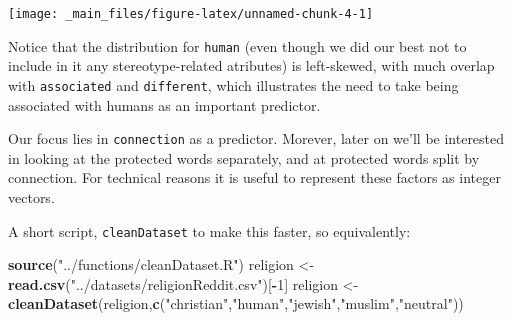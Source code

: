 \documentclass[12pt,]{book}
\newenvironment{Shaded}{\begin{snugshade}}{\end{snugshade}}
\newcommand{\KeywordTok}[1]{\textcolor[rgb]{0.13,0.29,0.53}{\textbf{#1}}}
\newcommand{\DecValTok}[1]{\textcolor[rgb]{0.00,0.00,0.81}{#1}}
\newcommand{\StringTok}[1]{\textcolor[rgb]{0.31,0.60,0.02}{#1}}
\newcommand{\OperatorTok}[1]{\textcolor[rgb]{0.81,0.36,0.00}{\textbf{#1}}}
\newcommand{\NormalTok}[1]{#1}
\begin{document}
\vspace{1mm} \footnotesize

\begin{center}\texttt{[image: \_main\_files/figure-latex/unnamed-chunk-4-1]} \end{center}

\normalsize

\noindent Notice that the distribution for \texttt{human} (even though
we did our best not to include in it any stereotype-related atributes)
is left-skewed, with much overlap with \texttt{associated} and
\texttt{different}, which illustrates the need to take being associated
with humans as an important predictor.

Our focus lies in \texttt{connection} as a predictor. Morever, later on
we'll be interested in looking at the protected words separately, and at
protected words split by connection. For technical reasons it is useful
to represent these factors as integer vectors.

\vspace{1mm} \footnotesize

\begin{Shaded}
\end{Shaded}

\normalsize

A short script, \texttt{cleanDataset} to make this faster, so
equivalently:

\vspace{1mm} \footnotesize

\begin{Shaded}
\begin{Highlighting}[]
\KeywordTok{source}\NormalTok{(}\StringTok{"../functions/cleanDataset.R"}\NormalTok{)}
\NormalTok{religion <-}\StringTok{ }\KeywordTok{read.csv}\NormalTok{(}\StringTok{"../datasets/religionReddit.csv"}\NormalTok{)[}\OperatorTok{-}\DecValTok{1}\NormalTok{]}
\NormalTok{religion <-}\StringTok{ }\KeywordTok{cleanDataset}\NormalTok{(religion,}\KeywordTok{c}\NormalTok{(}\StringTok{"christian"}\NormalTok{,}\StringTok{"human"}\NormalTok{,}\StringTok{"jewish"}\NormalTok{,}\StringTok{"muslim"}\NormalTok{,}\StringTok{"neutral"}\NormalTok{))}
\end{Highlighting}
\end{Shaded}
\end{document}
